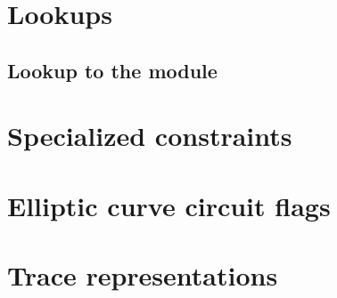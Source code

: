 \section{Lookups}
\subsection{Lookup to the \wcpMod{} module}                                 \label{bls: lookups: wcp}                                       

\section{Specialized constraints}                                           \label{bls: specialized constraints}                            

\section{Elliptic curve circuit flags}                                      \label{bls: circuits}                                           

\newpage
\section{Trace representations}                                             \label{bls: trace representations}                              